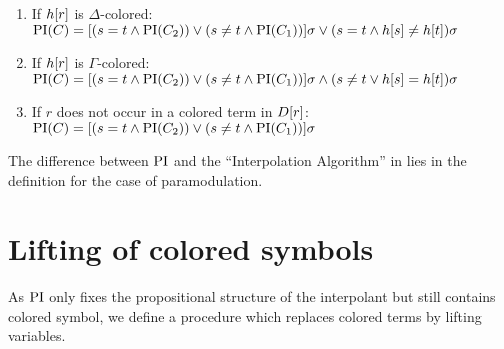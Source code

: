 \begin{defi}
\begin{itemize}
\begin{enumerate}
        \item If $h[r]$ is $\Delta$-colored: 
          \label{def:PI_paramod_1}
          \newline
          $\operatorname{PI}(C) = [ ( s=t \land \operatorname{PI}(C_2) ) \lor (s\neq t \land \operatorname{PI}(C_1)) ]\sigma \lor (s=t \land h[s] \neq      h[t])\sigma$
        \item If $h[r]$ is $\Gamma$-colored:
          \label{def:PI_paramod_2}
          \newline
          $\operatorname{PI}(C) = [ ( s=t \land \operatorname{PI}(C_2) ) \lor (s\neq t \land \operatorname{PI}(C_1)) ]\sigma \land (s\neq t \lor h[s] =     h[t])\sigma$
        \item If $r$ does not occur in a colored term in $D[r]$:
          \label{def:PI_paramod_3}
          \newline
          $\operatorname{PI}(C) = [ ( s=t \land \operatorname{PI}(C_2) ) \lor (s\neq t \land \operatorname{PI}(C_1)) ]\sigma$ \qedhere

      \end{enumerate}

  \end{itemize}
\end{defi}


The difference between $\operatorname{PI}$ and the ``Interpolation Algorithm'' in \cite{Huang95} lies in the definition for the case of paramodulation.
\mytodo{}


\section{Lifting of colored symbols}
As $\operatorname{PI}$ only fixes the propositional structure of the interpolant but still contains colored symbol, 
we define a procedure which replaces colored terms by lifting variables.


